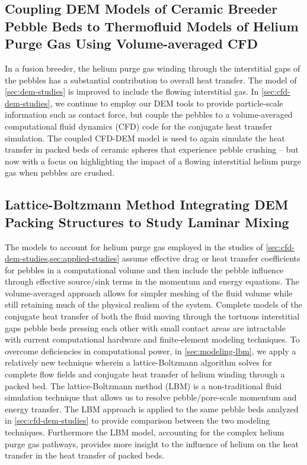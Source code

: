 \subsection*{Coupling DEM Models of Ceramic Breeder Pebble Beds to Thermofluid Models of Helium Purge Gas Using Volume-averaged CFD}
In a fusion breeder, the helium purge gas winding through the interstitial gaps of the pebbles has a substantial contribution to overall heat transfer.\cite{Reimann:2002mi,Abou-Sena2005} The model of \cref{sec:dem-studies} is improved to include the flowing interstitial gas. In \cref{sec:cfd-dem-studies}, we continue to employ our DEM tools to provide particle-scale information such as contact force, but couple the pebbles to a volume-averaged computational fluid dynamics (CFD) code for the conjugate heat transfer simulation. The coupled CFD-DEM model is used to again simulate the heat transfer in packed beds of ceramic spheres that experience pebble crushing -- but now with a focus on highlighting the impact of a flowing interstitial helium purge gas when pebbles are crushed.


\subsection*{Lattice-Boltzmann Method Integrating DEM Packing Structures to Study Laminar Mixing}
The models to account for helium purge gas employed in the studies of \cref{sec:cfd-dem-studies,sec:applied-studies} assume effective drag or heat transfer coefficients for pebbles in a computational volume and then include the pebble influence through effective source/sink terms in the momentum and energy equations. The volume-averaged approach allows for simpler meshing of the fluid volume while still retaining much of the physical realism of the system. Complete models of the conjugate heat transfer of both the fluid moving through the tortuous interstitial gaps pebble beds pressing each other with small contact areas are intractable with current computational hardware and finite-element modeling techniques. To overcome deficiencies in computational power, in \cref{sec:modeling-lbm}, we apply a relatively new technique wherein a lattice-Boltzmann algorithm solves for complete flow fields and conjugate heat transfer of helium winding through a packed bed. The lattice-Boltzmann method (LBM) is a non-traditional fluid simulation technique that allows us to resolve pebble/pore-scale momentum and energy transfer. The LBM approach is applied to the same pebble beds analyzed in \cref{sec:cfd-dem-studies} to provide comparison between the two modeling techniques. Furthermore the LBM model, accounting for the complex helium purge gas pathways, provides more insight to the influence of helium on the heat transfer in the heat transfer of packed beds.





